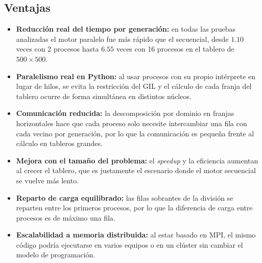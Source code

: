 \documentclass{article}
\begin{document}
\subsection{Ventajas}
\begin{itemize}
    \item \textbf{Reducción real del tiempo por generación:} en todas las pruebas analizadas el motor paralelo fue más rápido que el secuencial, desde $1.10$ veces con 2 procesos hasta $6.55$ veces con 16 procesos en el tablero de $500 \times 500$.
    \item \textbf{Paralelismo real en Python:} al usar procesos con su propio intérprete en lugar de hilos, se evita la restricción del GIL y el cálculo de cada franja del tablero ocurre de forma simultánea en distintos núcleos.
    \item \textbf{Comunicación reducida:} la descomposición por dominio en franjas horizontales hace que cada proceso solo necesite intercambiar una fila con cada vecino por generación, por lo que la comunicación es pequeña frente al cálculo en tableros grandes.
    \item \textbf{Mejora con el tamaño del problema:} el \textit{speedup} y la eficiencia aumentan al crecer el tablero, que es justamente el escenario donde el motor secuencial se vuelve más lento.
    \item \textbf{Reparto de carga equilibrado:} las filas sobrantes de la división se reparten entre los primeros procesos, por lo que la diferencia de carga entre procesos es de máximo una fila.
    \item \textbf{Escalabilidad a memoria distribuida:} al estar basado en MPI, el mismo código podría ejecutarse en varios equipos o en un clúster sin cambiar el modelo de programación.
\end{itemize}
\end{document}
